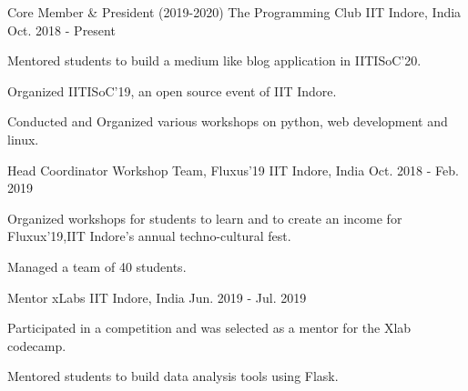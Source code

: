 
\begin{cventries}

  \cventry
    {Core Member \& President (2019-2020)} %
    {The Programming Club} %
    {IIT Indore, India} %
    {Oct. 2018 - Present} %
    {
      \begin{cvitems} %
        \item {Mentored students to build a medium like blog application in IITISoC'20.}
        \item {Organized IITISoC'19, an open source event of IIT Indore.}
        \item {Conducted and Organized various workshops on python, web development and linux.}
      \end{cvitems}
    }
    
  \cventry
    {Head Coordinator} %
    {Workshop Team, Fluxus'19} %
    {IIT Indore, India} %
    {Oct. 2018 - Feb. 2019} %
    {
      \begin{cvitems} %
        \item {Organized workshops for students to learn and to create an income for Fluxux'19,IIT Indore's annual techno-cultural fest.}
        \item {Managed a team of 40 students.}
      \end{cvitems}
    }
  \cventry
    {Mentor} %
    {xLabs} %
    {IIT Indore, India} %
    {Jun. 2019 - Jul. 2019} %
    {
      \begin{cvitems} %
        \item {Participated in a competition and was selected as a mentor for the Xlab codecamp.}
        \item {Mentored students to build data analysis tools using Flask.}
      \end{cvitems}
    }
\end{cventries}